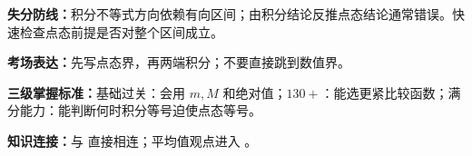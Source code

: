 \begin{knowledgeBox}
\textbf{失分防线：}积分不等式方向依赖有向区间；由积分结论反推点态结论通常错误。快速检查点态前提是否对整个区间成立。

\textbf{考场表达：}先写点态界，再两端积分；不要直接跳到数值界。

\textbf{三级掌握标准：}基础过关：会用 \(m,M\) 和绝对值；\(130+\)：能选更紧比较函数；满分能力：能判断何时积分等号迫使点态等号。

\textbf{知识连接：}与 直接相连；平均值观点进入 。
\end{knowledgeBox}


\par


